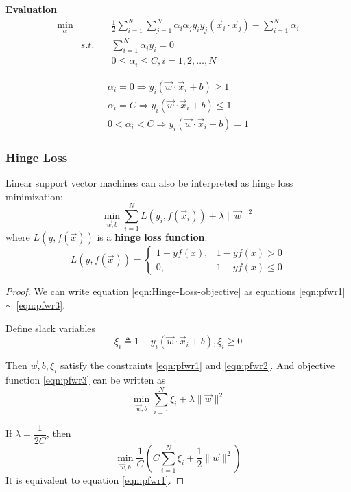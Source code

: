 \textbf{Evaluation}
\begin{eqnarray}
 \min_{\alpha} && \frac{1}{2} \sum\limits_{i=1}^N\sum\limits_{j=1}^N \alpha_i\alpha_j y_i y_j (\vec{x}_i \cdot \vec{x}_j) - \sum\limits_{i=1}^N \alpha_i \\
               & s.t.  \quad & \sum\limits_{i=1}^N\alpha_i y_i=0 \\
               && 0 \leqslant  \alpha_i \leqslant C, i=1,2, \dots, N
\end{eqnarray}

\begin{eqnarray}
\alpha_i=0 \Rightarrow y_i(\vec{w} \cdot \vec{x}_i+b)\geqslant 1 \\
\alpha_i=C \Rightarrow y_i(\vec{w} \cdot \vec{x}_i+b)\leqslant 1 \\
0<\alpha_i<C \Rightarrow y_i(\vec{w} \cdot \vec{x}_i+b)= 1
\end{eqnarray}


\subsubsection{Hinge Loss}
Linear support vector machines can also be interpreted as hinge loss minimization:
\begin{equation}\label{eqn:Hinge-Loss-objective}
\min_{\vec{w},b} \sum\limits_{i=1}^N{L(y_i,f(\vec{x}_i))} + \lambda\|\vec{w}\|^2
\end{equation}
where $L(y, f(\vec{x}))$ is a \textbf{hinge loss function}:
\begin{equation}
L(y, f(\vec{x})) = \begin{cases}
1-yf(x),  & 1-yf(x) > 0 \\
0,  & 1-yf(x) \leqslant 0
\end{cases}
\end{equation}

\begin{proof}
We can write equation \ref{eqn:Hinge-Loss-objective} as equations \ref{eqn:pfwr1} $\sim$ \ref{eqn:pfwr3}.

Define slack variables
\begin{equation}
\xi_i \triangleq 1-y_i(\vec{w} \cdot \vec{x}_i + b),\xi_i \geqslant 0
\end{equation}

Then $\vec{w},b,\xi_i$ satisfy the constraints \ref{eqn:pfwr1} and \ref{eqn:pfwr2}. And objective function \ref{eqn:pfwr3} can be written as
\begin{equation}
\min_{\vec{w},b} \sum\limits_{i=1}^N{\xi_i}+ \lambda\|\vec{w}\|^2 \nonumber
\end{equation}

If $\lambda=\dfrac{1}{2C}$, then 
\begin{equation}
\min_{\vec{w},b} \dfrac{1}{C}\left(C\sum\limits_{i=1}^N{\xi_i}+\dfrac{1}{2}\|\vec{w}\|^2\right)
\end{equation}
It is equivalent to equation \ref{eqn:pfwr1}.

\end{proof}



